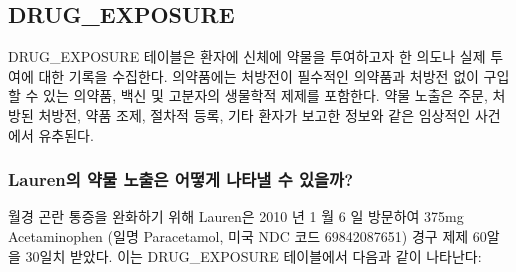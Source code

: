 \documentclass[11pt]{book}
\theoremstyle{definition}
\theoremstyle{definition}
\theoremstyle{definition}
\theoremstyle{remark}
\begin{document}
\subsection{DRUG\_EXPOSURE}\label{drugExposure}

DRUG\_EXPOSURE 테이블은 환자에 신체에 약물을 투여하고자 한 의도나 실제
투여에 대한 기록을 수집한다. 의약품에는 처방전이 필수적인 의약품과
처방전 없이 구입할 수 있는 의약품, 백신 및 고분자의 생물학적 제제를
포함한다. 약물 노출은 주문, 처방된 처방전, 약품 조제, 절차적 등록, 기타
환자가 보고한 정보와 같은 임상적인 사건에서 유추된다.

\subsubsection*{Lauren의 약물 노출은 어떻게 나타낼 수
있을까?}\label{lauren------}

월경 곤란 통증을 완화하기 위해 Lauren은 2010 년 1 월 6 일 방문하여 375mg
Acetaminophen (일명 Paracetamol, 미국 NDC 코드 69842087651) 경구 제제
60알을 30일치 받았다. 이는 DRUG\_EXPOSURE 테이블에서 다음과 같이
나타난다:
\end{document}
